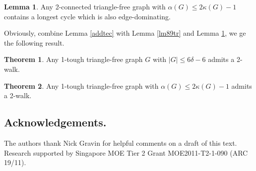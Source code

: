 \documentclass{amsart}
\theoremstyle{definition}
\newtheorem{theorem}{Theorem}
\newtheorem{lemma}{Lemma}
\begin{document}
\begin{lemma}\cite[Theorem 6]{ozeki2011dominating}\label{lm11tr}
Any 2-connected triangle-free graph with $\alpha(G)\le2\kappa(G)-1$ contains a longest cycle which is also edge-dominating.
\end{lemma}

Obviously, combine Lemma \ref{addtec} with Lemma \ref{lm89tr} and Lemma \ref{lm11tr}, we ge the following result.
\begin{theorem}
Any 1-tough triangle-free graph $G$ with  $|G|\le6\delta-6$ admits a 2-walk.
\end{theorem}

\begin{theorem}
Any 1-tough triangle-free graph with  $\alpha(G)\le2\kappa(G)-1$ admits a 2-walk.
\end{theorem}



\subsection*{Acknowledgements.}
The authors thank Nick Gravin
for helpful comments on a draft of this text.
Research supported by Singapore MOE Tier 2 Grant MOE2011-T2-1-090 (ARC 19/11). 



%
\end{document}

